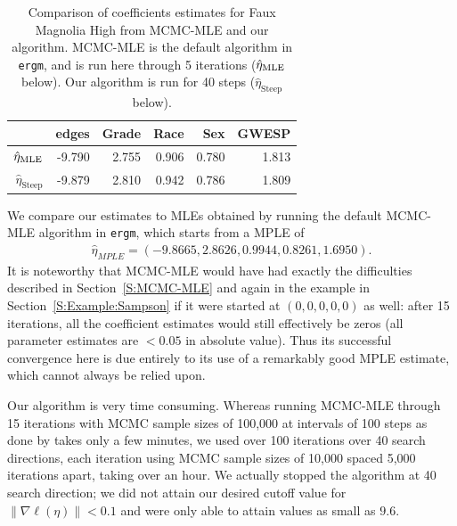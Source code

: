 \begin{table}[h]  
\begin{center} 
\caption[Comparison of coefficients estimates for Faux Magnolia High from 
MCMC-MLE and our algorithm]{Comparison of coefficients estimates for Faux Magnolia High from MCMC-MLE and our algorithm.  MCMC-MLE is the default algorithm
in \texttt{ergm}, and is run here through 5 iterations ($\hat{\eta}_{\textrm{MLE}}$ below).
Our algorithm is run for 40 steps ($\hat{\eta}_{\textrm{Steep}}$ below).}
\begin{tabular}{rrrrrr}
  \hline
 & edges & Grade & Race & Sex & GWESP \\ 
  \hline
$\hat{\eta}_{\textrm{MLE}}$ & -9.790 & 2.755 & 0.906 & 0.780 & 1.813 \\ 
$\hat{\eta}_{\textrm{Steep}}$ & -9.879 & 2.810 & 0.942 & 0.786 & 1.809 \\ 
   \hline
\end{tabular}\label{T:FauxMagnolia}
\end{center}
\end{table}

We compare our estimates to MLEs obtained by running the default MCMC-MLE algorithm 
in \texttt{ergm}, which starts from a MPLE of
\begin{align*}
	\hat{\eta}_{MPLE } = ( -9.8665, 2.8626, 0.9944, 0.8261, 1.6950 ).
\end{align*}
It is noteworthy that MCMC-MLE would have had exactly the difficulties 
described in Section~\ref{S:MCMC-MLE} and again in the example in
Section~\ref{S:Example:Sampson} if it were started at $(0, 0, 0, 0, 0)$ as well:
after 15 iterations, all the coefficient estimates would still effectively be zeros
(all parameter estimates are $< 0.05$ in absolute value).
Thus its successful convergence here is due entirely to its use of 
a remarkably good MPLE estimate, which cannot always be relied upon.

Our algorithm is very time consuming.  Whereas running MCMC-MLE through 15 iterations with MCMC sample sizes of 100,000 at intervals of 100 steps as done 
by \citet{statnet-tutorial} takes only a few minutes, 
we used over 100 iterations over 40 search directions, 
each iteration using MCMC sample sizes of 
10,000 spaced 5,000 iterations apart, taking over an hour.  We actually stopped the 
algorithm at 40 search direction; we did not attain our desired cutoff value for 
$\lVert \nabla \ell(\eta) \rVert < 0.1$ and were only able to 
attain values as small as $9.6$.
 
